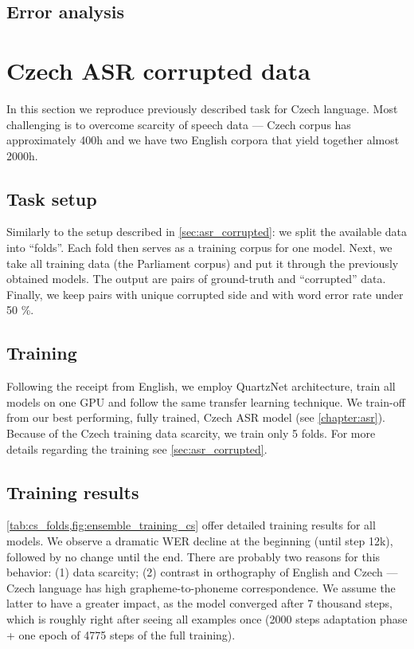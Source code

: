 \subsection{Error analysis}

\section{Czech ASR corrupted data}
In this section we reproduce previously described task for Czech language. Most challenging is to overcome scarcity of speech data --- Czech corpus has approximately 400h and we have two English corpora that yield together almost 2000h.

\subsection{Task setup}
Similarly to the setup described in \cref{sec:asr_corrupted}: we split the available data into ``folds''. Each fold then serves as a training corpus for one model. Next, we take all training data (the Parliament corpus) and put it through the previously obtained models. The output are pairs of ground-truth and ``corrupted'' data. Finally, we keep pairs with unique corrupted side and with word error rate under 50 \%.

\subsection{Training}
Following the receipt from English, we employ QuartzNet architecture, train all models on one GPU and follow the same transfer learning technique. We train-off from our best performing, fully trained, Czech ASR model (see \cref{chapter:asr}). Because of the Czech training data scarcity, we train only 5 folds. For more details regarding the training see \cref{sec:asr_corrupted}.

\subsection{Training results}
\cref{tab:cs_folds,fig:ensemble_training_cs} offer detailed training results for all models. We observe a dramatic WER decline at the beginning (until step 12k), followed by no change until the end. There are probably two reasons for this behavior: (1) data scarcity; (2) contrast in orthography of English and Czech --- Czech language has high grapheme-to-phoneme correspondence. We assume the latter to have a greater impact, as the model converged after 7 thousand steps, which is roughly right after seeing all examples once (2000 steps adaptation phase + one epoch of 4775 steps of the full training).

